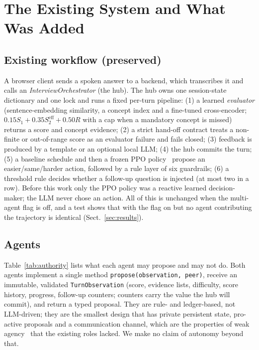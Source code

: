 \section{The Existing System and What Was Added}\label{sec:design}
\subsection{Existing workflow (preserved)}
A browser client sends a spoken answer to a backend, which transcribes it and calls an \emph{InterviewOrchestrator} (the hub). The hub owns one session-state dictionary and one lock and runs a fixed per-turn pipeline: (1) a learned \emph{evaluator} (sentence-embedding similarity, a concept index and a fine-tuned cross-encoder; $0.15S_1{+}0.35S_2^{\mathrm{eff}}{+}0.50R$ with a cap when a mandatory concept is missed) returns a score and concept evidence; (2) a strict hand-off contract treats a non-finite or out-of-range score as an evaluator failure and fails closed; (3) feedback is produced by a template or an optional local LLM; (4) the hub commits the turn; (5) a baseline schedule and then a frozen PPO policy~\cite{ppo,sb3} propose an easier/same/harder action, followed by a rule layer of six guardrails; (6) a threshold rule decides whether a follow-up question is injected (at most two in a row). Before this work only the PPO policy was a reactive learned decision-maker; the LLM never chose an action. All of this is unchanged when the multi-agent flag is off, and a test shows that with the flag on but no agent contributing the trajectory is identical (Sect.~\ref{sec:results}).

\subsection{Agents}
\begin{table}[tbp]
\centering\small
\caption{Authority matrix, generated from the enforcing code (\texttt{agents/multiagent/authority.py}). Neither agent has any state-write authority; the hub commits.}\label{tab:authority}

\end{table}
Table~\ref{tab:authority} lists what each agent may propose and may not do. Both agents implement a single method \texttt{propose(observation, peer)}, receive an immutable, validated \texttt{TurnObservation} (score, evidence lists, difficulty, score history, progress, follow-up counters; counters carry the value the hub will commit), and return a typed proposal. They are rule- and ledger-based, not LLM-driven; they are the smallest design that has private persistent state, pro-active proposals and a communication channel, which are the properties of weak agency~\cite{wj95} that the existing roles lacked. We make no claim of autonomy beyond that.

